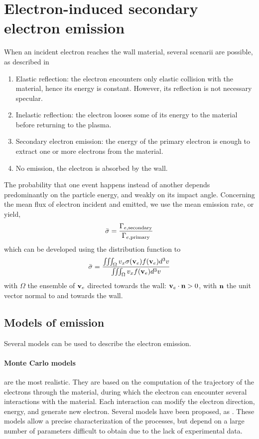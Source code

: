 
\section{Electron-induced secondary electron emission}
\label{sec-seemodel}
When an incident electron reaches the wall material, several scenarii are possible, as described in \citet{villemant2018}
\begin{enumerate}
  \item Elastic reflection\string: the electron encounters only elastic collision with the material, hence its energy is constant. However, its reflection is not necessary specular.
  \item Inelastic reflection\string: the electron looses some of its energy to the material before returning to the plasma.
  \item Secondary electron emission\string: the energy of the primary electron is enough to extract one or more electrons from the material.
  \item No emission, the electron is absorbed by the wall.
\end{enumerate}

The probability \proba{}  that one event happens instead of another depends predominantly on the particle energy, and weakly on its  impact angle.
Concerning the mean flux of electron incident and emitted, we use the mean emission rate, or yield, \rate
\begin{equation*} \label{eq-ratedifinition}
   \bar{\sigma } = \frac{\Gamma_{e, \rm secondary}}{\Gamma_{e, \rm primary}}
\end{equation*}
which can be developed using the distribution function to 
\begin{equation*} \label{eq-ratedifinition_evdf}
   \bar{\sigma } = \frac{\iiint_{\Omega} v_x \sigma ({\mathbf v_e}) f({\mathbf v_e}) d^3v}{\iiint_{\Omega} v_x  f({\mathbf v_e}) d^3v}
\end{equation*}
with $\Omega$ the ensemble of ${\mathbf v_e}$ directed towards the wall\string: ${\mathbf v_e} \cdot {\mathbf n} > 0$, with ${\mathbf n} $ the unit vector normal to and towards the wall.

\subsection{Models of emission } \label{subsec-seemodels}
Several models can be used to describe the electron emission.

\paragraph{Monte Carlo models} are the most realistic.
 They are based on the computation of the trajectory of the electrons through the material, during which the electron can encounter several interactions with the material.
 Each interaction can modify the electron direction, energy, and generate new electron.
 Several models have been proposed, as \citet{furman2002,pierron2017}.
 These models allow a precise characterization of the processes, but depend on a large number of parameters difficult to obtain due to the lack of experimental data.
 
